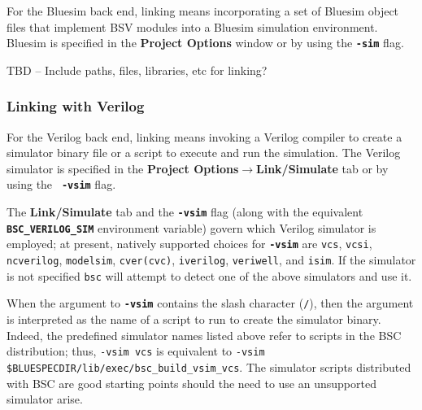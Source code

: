 \documentclass{article}
\newcommand{\te}[1]{\texttt{#1}}
\begin{document}
For the Bluesim back end, linking means incorporating a set of Bluesim object
files that implement BSV modules into a Bluesim simulation
environment.
Bluesim is specified in the {\bf Project Options} window
or by using the {\bf\tt -sim} flag.

TBD -- Include paths, files, libraries, etc for linking?


\subsubsection{Linking with Verilog}

For the Verilog back end, linking means invoking a Verilog compiler to create a
simulator binary file or a script to execute and run the
simulation.
The Verilog simulator is specified in the {\bf Project
Options$\rightarrow$Link/Simulate} tab or by  using the {\bf\tt
-vsim} flag.

\index{-vsim@\te{-vsim} (compiler flag)}

\label{sec:using-verilog}
The {\bf Link/Simulate} tab and the \textbf{\texttt{-vsim}} flag
(along with the equivalent
\textbf{\texttt{BSC\_VERILOG\_SIM}} environment variable) govern which Verilog
simulator is employed; at present, natively supported choices for
\textbf{\texttt{-vsim}} are \texttt{vcs}, \texttt{vcsi}, \texttt{ncverilog},
\texttt{modelsim}, \texttt{cver(cvc)},  \texttt{iverilog},
\texttt{veriwell}, and \texttt{isim}.  If the simulator is not specified \texttt{bsc} will attempt to detect one
of the above simulators and use it.

When the argument to \textbf{\texttt{-vsim}} contains the slash character
(\texttt{/}), then the argument is interpreted as the name of a script to run
to create the simulator binary.  Indeed, the predefined simulator names listed
above refer to scripts in the BSC distribution; thus,
\texttt{-vsim vcs} is equivalent to \texttt{-vsim
\$BLUESPECDIR/lib/exec/bsc\_build\_vsim\_vcs}.  The simulator scripts distributed
with BSC are good starting points should the need to use an unsupported
simulator arise.
\end{document}

